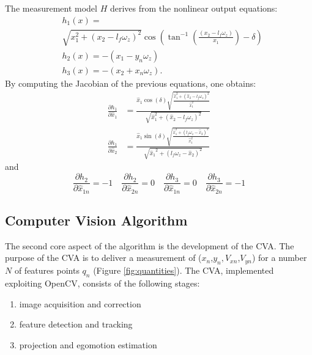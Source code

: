 \documentclass[letterpaper, 10 pt, conference]{ieeeconf}
\begin{document}
The measurement model $H$ derives from the nonlinear output equations:
\begin{align} 
&h_{1}(x) = \nonumber  \\
&  \sqrt {x_1^2 + {{\left( {{x_2} - {l_f}{\omega _z}} \right)}^2}}  \cos \left( {{{\tan }^{ - 1}}\left( {\frac{{\left( {{x_2} - {l_f}{\omega _z}} \right)}}{{{x_1}}}} \right) - \delta } \right)  \nonumber \\
& h_2(x) =  - \left( {{x_1} - {y_n}{\omega _z}} \right) \nonumber \\
& h_3(x) =  - \left( {{x_2} + {x_n}{\omega _z}} \right) \nonumber.
\label{eq:h1}
\end{align}
By computing the Jacobian of the previous equations, one obtains:
\begin{align}
\frac{{\partial {h_1}}}{{\partial {{\hat x}_1}}} &= \frac{{{{\hat x}_1}\cos \left( \delta  \right)\sqrt {\frac{{\hat x_1^2 + {{\left( {{{\hat x}_2} - {l_f}{\omega _z}} \right)}^2}}}{{\hat x_1^2}}} }}{{\sqrt {\hat x_1^2 + {{\left( {{{\hat x}_2} - {l_f}{\omega _z}} \right)}^2}} }} \\
\frac{{\partial {h_1}}}{{\partial {{\hat x}_2}}} &= \frac{{{{\hat x}_1}\sin \left( \delta  \right)\sqrt {\frac{{\hat x_1^2 + {{\left( {{l_f}{\omega _z} - {{\hat x}_2}} \right)}^2}}}{{\hat x_1^2}}} }}{{\sqrt {{{\hat x}_1}^2 + {{\left( {{l_f}{\omega _z} - {{\hat x}_2}} \right)}^2}} }}
\end{align}
and
\begin{equation}
\frac{{\partial {h_2}}}{{\partial {{\hat x}_{1n}}}} =  - 1\quad \frac{{\partial {h_2}}}{{\partial {{\hat x}_{2n}}}} = 0\quad \frac{{\partial {h_3}}}{{\partial {{\hat x}_{1n}}}} = 0\quad \frac{{\partial {h_3}}}{{\partial {{\hat x}_{2n}}}} =  - 1
\end{equation}

\subsection{Computer Vision Algorithm}

The second core aspect of the algorithm is the development of the CVA. The purpose of the CVA is to deliver a measurement of ($x_{n}$,$y_{n},V_{xn}$,$V_{yn}$) for a number $N$  of features points $q_n$ (Figure \ref{fig:quantities}). The CVA, implemented exploiting OpenCV, consists of the following stages:
\begin{enumerate}
	\item image acquisition and correction \label{enum::correction}
	\item feature detection and tracking	\label{enum::tracking}
	\item projection and egomotion estimation	\label{enum::projection}
\end{enumerate}
\end{document}
